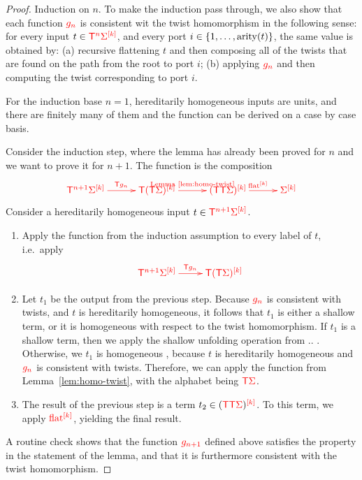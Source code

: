 \begin{proof}
    Induction on $n$. To make the induction pass through, we also show that each function $\ranked{g_n}$ is consistent wit the  twist homomorphism in the following sense: for every input $t \in \tmonadn n \mati k \rSigma$, and every port $i \in \set{1,\ldots,\arity t}$, the same value is obtained by: (a) recursive flattening $t$ and then composing all of the twists that are found on the path from the root to port $i$; (b) applying $\ranked{g_n}$ and then computing the twist corresponding to port $i$. 
    
    For the induction base $n=1$, hereditarily homogeneous inputs are units, and there are finitely many of them and the function can be derived on a case by case basis. 
    
    Consider the induction step, where the lemma has already been proved for $n$ and we want to prove it for $n+1$. The function is the composition
    \begin{align*}
        \ranked{
            \xymatrix@C=1cm{
                \tmonadn {n+1} \mati k \Sigma \ar[r]^{\tmonad g_n} & \tmonad \mati k{(\tmonad \Sigma)} \ar[r]^{\text{Lemma~\ref{lem:homo-twist}}}&  \mati k  {(\tmonad \tmonad \rSigma)} \ar[r]^{\mati k \flatt} & \mati k \rSigma
            }
        }
    \end{align*}
    Consider a  hereditarily homogeneous input $t   \in \ranked{\tmonadn{n+1} \mati k \Sigma}$. 
    \begin{enumerate}
            \item Apply the function from the induction assumption to every label of $t$, i.e.~apply 
        \begin{align*}
        \ranked{
            \xymatrix{
                \tmonadn {n+1} \mati k \Sigma \ar[r]^{\tmonad g_n} & \tmonad \mati k{(\tmonad \Sigma)}
            }
        }
        \end{align*}
        \item Let $t_1$ be the output from the previous step. Because $\ranked {g_n}$ is consistent with twists, and $t$ is hereditarily homogeneous, it follows that $t_1$  is either a shallow term, or it is homogeneous with respect to the twist homomorphism.  If $t_1$ is a shallow term, then we apply the shallow unfolding operation from .. . Otherwise, we $t_1$ is homogeneous
        , because $t$ is hereditarily homogeneous and $\ranked{g_n}$ is consistent with twists. Therefore, we can apply the function
        from Lemma~\ref{lem:homo-twist}, with the alphabet being $\tmonad \rSigma$. 
        \item The result of the previous step is a term $t_2 \in \mati k {(\tmonad \tmonad \rSigma)}$. To this term, we apply $\mati k \flatt$, yielding the final result.
    \end{enumerate}
    A routine check shows that the function $\ranked{g_{n+1}}$ defined above satisfies the property in the statement of the lemma, and that it is furthermore consistent with the twist homomorphism.     
\end{proof}